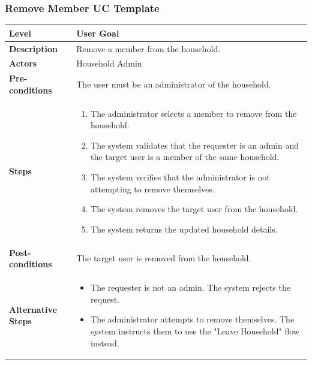 \subsubsection{Remove Member UC Template}
\begin{longtable}{|p{3.5cm}|p{10.3cm}|}
\hline
\rowcolor{UCRow} \textbf{Level} & User Goal \\ \hline
\textbf{Description} & Remove a member from the household. \\ \hline
\rowcolor{UCRow} \textbf{Actors} & Household Admin \\ \hline
\textbf{Pre-conditions} & The user must be an administrator of the household. \\ \hline
\rowcolor{UCRow} \textbf{Steps} &
\begin{enumerate}[nosep, leftmargin=*]
    \item The administrator selects a member to remove from the household.
    \item The system validates that the requester is an admin and the target user is a member of the same household.
    \item The system verifies that the administrator is not attempting to remove themselves.
    \item The system removes the target user from the household.
    \item The system returns the updated household details.
\end{enumerate} \\ \hline
\textbf{Post-conditions} & The target user is removed from the household. \\ \hline
\rowcolor{UCRow} \textbf{Alternative Steps} &
\begin{itemize}[nosep, leftmargin=2.5em]
    \item[\textbf{A1.}] The requester is not an admin. The system rejects the request.
    \item[\textbf{A2.}] The administrator attempts to remove themselves. The system instructs them to use the "Leave Household" flow instead.
\end{itemize} \\ \hline
\end{longtable}

